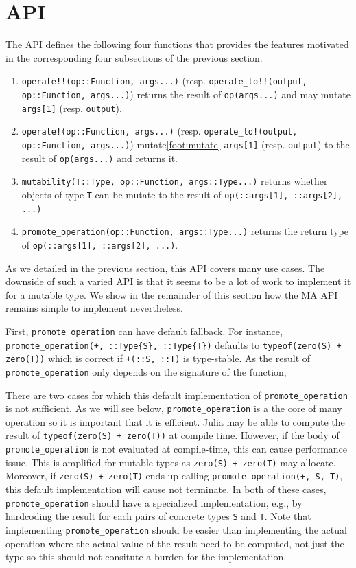 \documentclass{juliacon}
\begin{document}
\section{API}

The API defines the following four functions that provides the features motivated in the corresponding four subsections of the previous section.
\begin{enumerate}
  \item \lstinline|operate!!(op::Function, args...)| (resp. \lstinline|operate_to!!(output, op::Function, args...)|) returns the result of \lstinline|op(args...)| and may mutate \lstinline|args[1]| (resp. \lstinline|output|).
  \item \lstinline|operate!(op::Function, args...)| (resp. \lstinline|operate_to!(output, op::Function, args...)|) mutate\cref{foot:mutate} \lstinline|args[1]| (resp. \lstinline|output|) to the result of \lstinline|op(args...)| and returns it.
  \item \lstinline|mutability(T::Type, op::Function, args::Type...)| returns whether objects of type \lstinline|T| can be mutate to the result of \lstinline|op(::args[1], ::args[2], ...)|.
  \item \lstinline|promote_operation(op::Function, args::Type...)| returns the return type of \lstinline|op(::args[1], ::args[2], ...)|.
\end{enumerate}

As we detailed in the previous section, this API covers many use cases.
The downside of such a varied API is that it seems to be a lot of work to implement it for a mutable type.
We show in the remainder of this section how the MA API remains simple to implement nevertheless.

First, \lstinline|promote_operation| can have default fallback.
For instance, \lstinline|promote_operation(+, ::Type{S}, ::Type{T})|
defaults to \lstinline|typeof(zero(S) + zero(T))| which is correct if \lstinline|+(::S, ::T)| is type-stable.
As the result of \lstinline|promote_operation| only depends on the signature of the function,

There are two cases for which this default implementation of \lstinline|promote_operation| is not sufficient.
As we will see below, \lstinline|promote_operation| is a the core of many operation so it is important that it is efficient.
Julia may be able to compute the result of \lstinline|typeof(zero(S) + zero(T))| at compile time.
However, if the body of \lstinline|promote_operation| is not evaluated at compile-time, this can cause performance issue.
This is amplified for mutable types as \lstinline|zero(S) + zero(T)| may allocate.
Moreover, if \lstinline|zero(S) + zero(T)| ends up calling \lstinline|promote_operation(+, S, T)|, this default implementation will cause not terminate.
In both of these cases, \lstinline|promote_operation| should have a specialized implementation, e.g., by hardcoding the result for each pairs of concrete types \lstinline|S| and \lstinline|T|.
Note that implementing \lstinline|promote_operation| should be easier than implementing the actual operation where the actual value of the result need to be computed, not just the type so this should not consitute a burden for the implementation.
\end{document}
